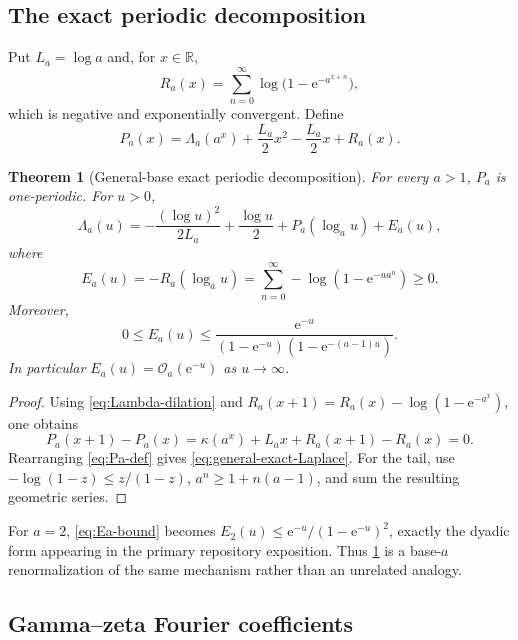 \documentclass[11pt,oneside]{article}
\newtheorem{theorem}{Theorem}[section]
\theoremstyle{definition}
\theoremstyle{remark}
\newcommand{\R}{\mathbb R}
\newcommand{\e}{\mathrm e}
\newcommand{\bigO}{\mathcal O}
\begin{document}
\subsection{The exact periodic decomposition}

Put $L_a=\log a$ and, for $x\in\R$,
\begin{equation}
 R_a(x)=\sum_{n=0}^{\infty}\log\bigl(1-\e^{-a^{x+n}}\bigr),
 \label{eq:Rax}
\end{equation}
which is negative and exponentially convergent.  Define
\begin{equation}
 P_a(x)=\Lambda_a(a^x)+\frac{L_a}{2}x^2-\frac{L_a}{2}x+R_a(x).
 \label{eq:Pa-def}
\end{equation}

\begin{theorem}[General-base exact periodic decomposition]
\label{thm:general-periodic}
For every $a>1$, $P_a$ is one-periodic.  For $u>0$,
\begin{equation}
 \boxed{\quad
 \Lambda_a(u)=
 -\frac{(\log u)^2}{2L_a}+\frac{\log u}{2}
 +P_a(\log_a u)+E_a(u),
 \quad}
 \label{eq:general-exact-Laplace}
\end{equation}
where
\begin{equation}
 E_a(u)=-R_a(\log_a u)
 =\sum_{n=0}^{\infty}-\log(1-\e^{-ua^n})\ge0.
 \label{eq:Ea}
\end{equation}
Moreover,
\begin{equation}
 0\le E_a(u)\le
 \frac{\e^{-u}}{(1-\e^{-u})(1-\e^{-(a-1)u})}.
 \label{eq:Ea-bound}
\end{equation}
In particular $E_a(u)=\bigO_a(\e^{-u})$ as $u\to\infty$.
\end{theorem}

\begin{proof}
Using \eqref{eq:Lambda-dilation} and
$R_a(x+1)=R_a(x)-\log(1-\e^{-a^x})$, one obtains
\[
 P_a(x+1)-P_a(x)
 =\kappa(a^x)+L_ax+R_a(x+1)-R_a(x)=0.
\]
Rearranging \eqref{eq:Pa-def} gives \eqref{eq:general-exact-Laplace}.  For the tail, use
$-\log(1-z)\le z/(1-z)$, $a^n\ge1+n(a-1)$, and sum the resulting geometric series.
\end{proof}

For $a=2$, \eqref{eq:Ea-bound} becomes
$E_2(u)\le\e^{-u}/(1-\e^{-u})^2$, exactly the dyadic form appearing in the primary
repository exposition.  Thus \cref{thm:general-periodic} is a base-$a$ renormalization of the
same mechanism rather than an unrelated analogy.

\subsection{Gamma--zeta Fourier coefficients}
\end{document}
